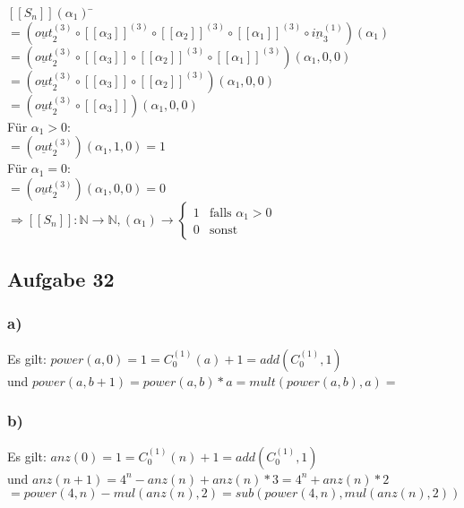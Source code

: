 \documentclass[11pt]{amsart}
\begin{document}
\begin{tabbing}
$[[S_n]](\alpha_1)$ \= $= (\underline{out}^{(3)}_2 \circ [[\alpha_3]]^{(3)}  
\circ [[\alpha_2]]^{(3)} \circ [[\alpha_1]]^{(3)} \circ \underline{in}^{(1)}_3)(\alpha_1)$ \\
\> $= (\underline{out}^{(3)}_2 \circ [[\alpha_3]] \circ [[\alpha_2]]^{(3)} \circ [[\alpha_1]]^{(3)})(\alpha_1,0,0)$ \\
\> $= (\underline{out}^{(3)}_2 \circ [[\alpha_3]] \circ [[\alpha_2]]^{(3)})(\alpha_1,0,0)$ \\
\> $= (\underline{out}^{(3)}_2 \circ [[\alpha_3]])(\alpha_1,0,0)$ \\
Für $\alpha_1 > 0$: \\
\> $= (\underline{out}^{(3)}_2)(\alpha_1,1,0) = 1$ \\
Für $\alpha_1 = 0$: \\
\> $= (\underline{out}^{(3)}_2)(\alpha_1,0,0) = 0$ \\
$\Rightarrow [[S_n]]: \mathbb{N} \rightarrow \mathbb{N}, (\alpha_1) \rightarrow \begin{cases} 1 &\mbox{falls } \alpha_1>0 \\ 0 &\mbox{sonst} \end{cases}$
\end{tabbing}

\subsection*{Aufgabe 32}

\subsubsection*{a)} Es gilt: $power(a,0) = 1 = C_0^{(1)}(a) + 1 = add(C_0^{(1)},1)$ \\
und $power(a,b+1) = power(a,b)*a = mult(power(a,b),a) = $ \\

\subsubsection*{b)} Es gilt: $anz(0) = 1 = C_0^{(1)}(n) + 1 = add(C_0^{(1)},1)$ \\
und $anz(n+1) = 4^n - anz(n) + anz(n) * 3  = 4^n + anz(n)*2$ \\
$ = power(4,n) - mul(anz(n),2) = sub(power(4,n),mul(anz(n),2))$ \\
\end{document}
